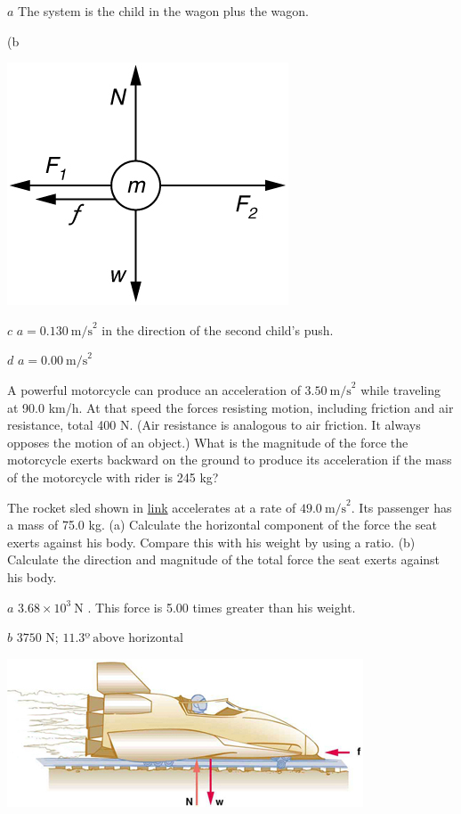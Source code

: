 \documentclass[
]{book}
\begin{document}
\leavevmode{}%
\(a\) The system is the child in the wagon plus the wagon.

(b

\includegraphics{images/Figure_04_03_06.jpg}

\(c\) \({{a = 0}\text{.}\text{130}\ \text{m/s}^{2}}{}\) in the direction
of the second child's push.

\(d\) \({{a = 0.00\ }\text{m/s}^{2}}{}\)

\hypertarget{fs-id2687795}{}
\leavevmode{}%
A powerful motorcycle can produce an acceleration of
\({3.50\ \text{m/s}^{2}}{}\) while traveling at 90.0 km/h. At that speed
the forces resisting motion, including friction and air resistance,
total 400 N. (Air resistance is analogous to air friction. It always
opposes the motion of an object.) What is the magnitude of the force the
motorcycle exerts backward on the ground to produce its acceleration if
the mass of the motorcycle with rider is 245 kg?

\hypertarget{fs-id3091858}{}
\leavevmode{}%
The rocket sled shown in \protect\hyperlink{fs-id1926895}{link}
accelerates at a rate of \({49.0\ \text{m/s}^{2}}{}\). Its passenger has a
mass of 75.0 kg. (a) Calculate the horizontal component of the force the
seat exerts against his body. Compare this with his weight by using a
ratio. (b) Calculate the direction and magnitude of the total force the
seat exerts against his body.

\leavevmode{}%
\(a\) \(3.68 \times 10^{3}\ \text{N}\) . This force is 5.00 times greater
than his weight.

\(b\) \({\text{3750\ N;\ 11.3º}\ \text{above\ horizontal}}{}\)

\includegraphics{images/Figure_04_03_07.jpg}
\end{document}
